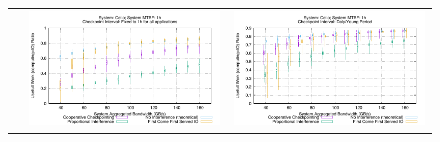 \documentclass[conference]{IEEEtran}
\begin{document}
\begin{figure}[t]
\begin{tabular}{C{.02\linewidth}C{.49\linewidth}C{.49\linewidth}}
 & \includegraphics[width=\linewidth]{sim/figures/1hMTBF-1hckpt-work-celio.pdf} & \includegraphics[width=\linewidth]{sim/figures/1hMTBF-dalyckpt-work-celio.pdf} \\

\end{tabular}
\end{figure}
\end{document}
